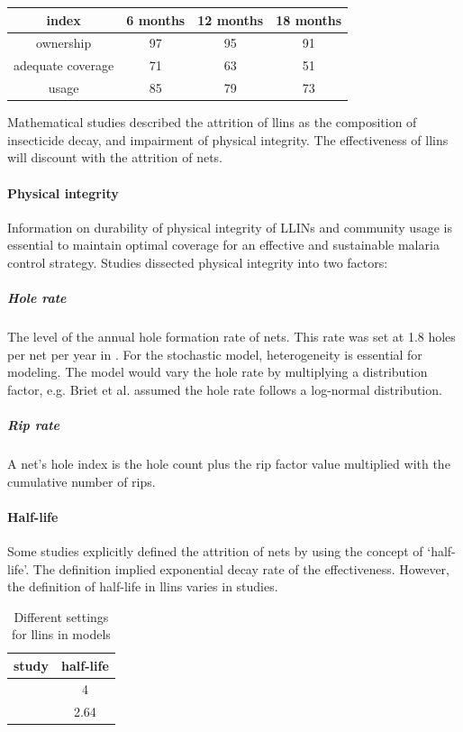 \documentclass[a4paper, 12pt, twoside]{report}
\begin{document}
\begin{center}
	\begin{tabular}{c c c c}
    \toprule
		index             & 6 months & 12 months & 18 months \\
    \midrule
		ownership         & 97       & 95        & 91        \\
		adequate coverage & 71       & 63        & 51        \\
		usage             & 85       & 79        & 73        \\
    \bottomrule
	\end{tabular}
\end{center}

Mathematical studies described the attrition of \gls{llins} as the composition of insecticide decay, and impairment of physical integrity.
The effectiveness of \gls{llins} will discount with the attrition of nets.

\paragraph{Physical integrity}
Information on durability of physical integrity of LLINs and community usage is essential to maintain optimal coverage for an effective and sustainable malaria control strategy.
Studies dissected physical integrity into two factors:

\subparagraph{Hole rate}%
\label{par:hole_rate}
The level of the annual hole formation rate of nets.
This rate was set at 1.8 holes per net per year in \cite{Briet2013}.
For the stochastic model, heterogeneity is essential for modeling.
The model would vary the hole rate by multiplying a distribution factor, e.g. Briet et al. \cite{Briet2013} assumed the hole rate follows a log-normal distribution.

\subparagraph{Rip rate}%
\label{par:rip_rate}
A net’s hole index is the hole count plus the rip factor value multiplied with the cumulative number of rips.

\paragraph{Half-life}
\label{par:half_life}

Some studies explicitly defined the attrition of nets by using the concept of `half-life'.
The definition implied exponential decay rate of the effectiveness.
However, the definition of half-life in \gls{llins} varies in studies.

\begin{table}[htpb]
  \centering
  \caption{Different settings for \gls{llins} in models}
  \label{tab:different_settings_for_llins}
  \begin{tabular}{cS}
  \toprule
  study & {half-life} \\
  \midrule
  \cite{Briet2013} & 4 \\
  \cite{Griffin2010} & 2.64 \\
  \bottomrule
  \end{tabular}
\end{table}
\end{document}
